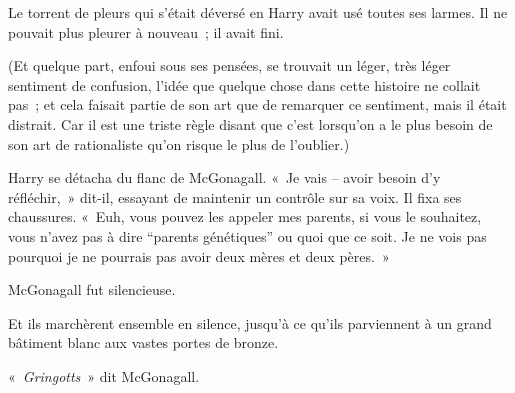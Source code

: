 Le torrent de pleurs qui s'était déversé en Harry avait usé toutes ses larmes. Il ne pouvait plus pleurer à nouveau~; il avait fini.

(Et quelque part, enfoui sous ses pensées, se trouvait un léger, très léger sentiment de confusion, l'idée que quelque chose dans cette histoire ne collait pas~; et cela faisait partie de son art que de remarquer ce sentiment, mais il était distrait. Car il est une triste règle disant que c'est lorsqu'on a le plus besoin de son art de rationaliste qu'on risque le plus de l'oublier.)

Harry se détacha du flanc de McGonagall. «~Je vais -- avoir besoin d'y réfléchir,~» dit-il, essayant de maintenir un contrôle sur sa voix. Il fixa ses chaussures. «~Euh, vous pouvez les appeler mes parents, si vous le souhaitez, vous n'avez pas à dire “parents génétiques” ou quoi que ce soit. Je ne vois pas pourquoi je ne pourrais pas avoir deux mères et deux pères.~»

McGonagall fut silencieuse.

Et ils marchèrent ensemble en silence, jusqu'à ce qu'ils parviennent à un grand bâtiment blanc aux vastes portes de bronze.

«~\emph{Gringotts}~» dit McGonagall.
